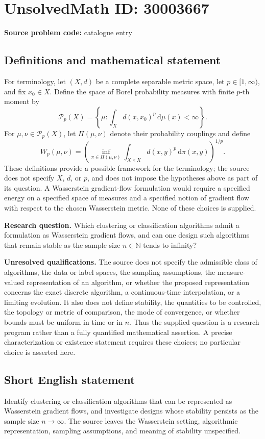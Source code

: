\documentclass[11pt]{article}
\newcommand{\N}{\mathbb{N}}
\begin{document}
\section*{UnsolvedMath ID: 30003667}
\textbf{Source problem code:} catalogue entry
\subsection{Definitions and mathematical statement}
For terminology, let \((X,d)\) be a complete separable metric space, let \(p\in[1,\infty)\), and fix \(x_0\in X\). Define the space of Borel probability measures with finite \(p\)-th moment by
\[
\mathcal P_p(X)=\left\{\mu:\int_X d(x,x_0)^p\,\mathrm d\mu(x)<\infty\right\}.
\]
For \(\mu,\nu\in\mathcal P_p(X)\), let \(\Pi(\mu,\nu)\) denote their probability couplings and define
\[
W_p(\mu,\nu)=\left(\inf_{\pi\in\Pi(\mu,\nu)}\int_{X\times X}d(x,y)^p\,\mathrm d\pi(x,y)\right)^{1/p}.
\]
These definitions provide a possible framework for the terminology; the source does not specify \(X\), \(d\), or \(p\), and does not impose the hypotheses above as part of its question. A Wasserstein gradient-flow formulation would require a specified energy on a specified space of measures and a specified notion of gradient flow with respect to the chosen Wasserstein metric. None of these choices is supplied.

\textbf{Research question.} Which clustering or classification algorithms admit a formulation as Wasserstein gradient flows, and can one design such algorithms that remain stable as the sample size \(n\in\N\) tends to infinity?

\textbf{Unresolved qualifications.} The source does not specify the admissible class of algorithms, the data or label spaces, the sampling assumptions, the measure-valued representation of an algorithm, or whether the proposed representation concerns the exact discrete algorithm, a continuous-time interpolation, or a limiting evolution. It also does not define stability, the quantities to be controlled, the topology or metric of comparison, the mode of convergence, or whether bounds must be uniform in time or in \(n\). Thus the supplied question is a research program rather than a fully quantified mathematical assertion. A precise characterization or existence statement requires these choices; no particular choice is asserted here.
\subsection{Short English statement}
Identify clustering or classification algorithms that can be represented as Wasserstein gradient flows, and investigate designs whose stability persists as the sample size \(n\to\infty\). The source leaves the Wasserstein setting, algorithmic representation, sampling assumptions, and meaning of stability unspecified.
\end{document}
